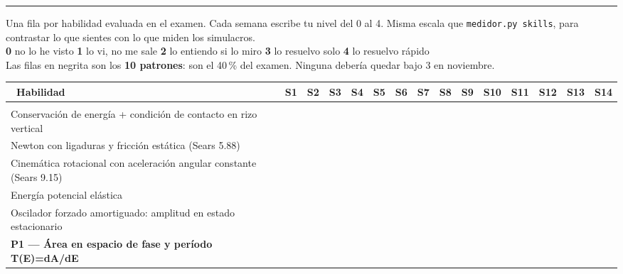 \documentclass[10pt]{article}
\renewcommand{\arraystretch}{1.28}
\newcommand{\seccion}[1]{\vspace{2mm}{\color{cab}\large\textbf{#1}}\vspace{1mm}\hrule\vspace{2mm}}
\begin{document}
\newpage

\seccion{Mapa de habilidades}
Una fila por habilidad evaluada en el examen. Cada semana escribe tu nivel del 0 al 4. Misma escala que
\texttt{medidor.py skills}, para contrastar lo que sientes con lo que miden los simulacros.\\[0.5mm]
\textbf{0} no lo he visto \quad \textbf{1} lo vi, no me sale \quad \textbf{2} lo entiendo si lo miro \quad
\textbf{3} lo resuelvo solo \quad \textbf{4} lo resuelvo rápido\\[1mm]
Las filas en negrita son los \textbf{10 patrones}: son el 40\,\% del examen. Ninguna debería quedar bajo 3 en noviembre.
\par\vspace{2.5mm}
{\renewcommand{\arraystretch}{1.34}\setlength{\tabcolsep}{5.2pt}
\noindent\begin{tabular}{@{}|p{10.4cm}|c|c|c|c|c|c|c|c|c|c|c|c|c|c|}
\hline
\rowcolor{cab}\color{white}\textbf{\ Habilidad} & \color{white}\scriptsize\textbf{S1} & \color{white}\scriptsize\textbf{S2} & \color{white}\scriptsize\textbf{S3} & \color{white}\scriptsize\textbf{S4} & \color{white}\scriptsize\textbf{S5} & \color{white}\scriptsize\textbf{S6} & \color{white}\scriptsize\textbf{S7} & \color{white}\scriptsize\textbf{S8} & \color{white}\scriptsize\textbf{S9} & \color{white}\scriptsize\textbf{S10} & \color{white}\scriptsize\textbf{S11} & \color{white}\scriptsize\textbf{S12} & \color{white}\scriptsize\textbf{S13} & \color{white}\scriptsize\textbf{S14}\\ \hline
\rowcolor{gris}\multicolumn{15}{|l|}{\textbf{\small Mecánica}}\\ \hline
\scriptsize Conservación de energía + condición de contacto en rizo vertical &   &   &   &   &   &   &   &   &   &   &   &   &   &  \\ \hline
\scriptsize Newton con ligaduras y fricción estática (Sears 5.88) &   &   &   &   &   &   &   &   &   &   &   &   &   &  \\ \hline
\scriptsize Cinemática rotacional con aceleración angular constante (Sears 9.15) &   &   &   &   &   &   &   &   &   &   &   &   &   &  \\ \hline
\scriptsize Energía potencial elástica &   &   &   &   &   &   &   &   &   &   &   &   &   &  \\ \hline
\scriptsize Oscilador forzado amortiguado: amplitud en estado estacionario &   &   &   &   &   &   &   &   &   &   &   &   &   &  \\ \hline
\scriptsize \textbf{P1 — Área en espacio de fase y período T(E)=dA/dE} &   &   &   &   &   &   &   &   &   &   &   &   &   &  \\ \hline

\end{tabular}}
\end{document}

